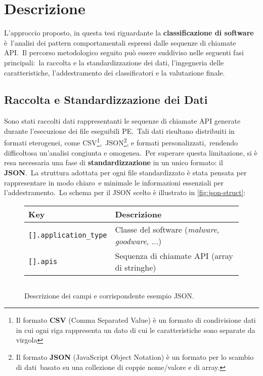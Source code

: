 \section{Descrizione}

L'approccio proposto, in questa tesi riguardante la \textbf{classificazione di software} è\
l'analisi dei pattern comportamentali espressi dalle sequenze di chiamate API.\
Il percorso metodologico seguito può essere suddiviso nelle seguenti fasi principali:\
la raccolta e la standardizzazione dei dati, l'ingegneria delle caratteristiche, l'addestramento dei classificatori
e la valutazione finale.

\subsection{Raccolta e Standardizzazione dei Dati}

Sono stati raccolti dati rappresentanti le sequenze di chiamate API generate durante l'esecuzione dei file eseguibili PE.\
Tali dati risultano distribuiti in formati eterogenei, come CSV\footnote{Il formato \textbf{CSV} (Comma Separated Value) è un formato di condivisione dati in cui ogni
    riga rappresenta un dato di cui le caratteristiche sono separate da virgola },\
JSON\footnote{Il formato \textbf{JSON} (JavaScript Object Notation) è un formato per lo scambio di dati\
    basato su una collezione di coppie nome/valore e di array.}, e formati personalizzati,\
rendendo difficoltosa un'analisi congiunta e omogenea.\
Per superare questa limitazione, si è resa necessaria una fase di \textbf{standardizzazione} in un unico formato:
il \textbf{JSON}.\
La struttura adottata per ogni file standardizzato è stata pensata per rappresentare in modo chiaro\
e minimale le informazioni essenziali per l'addestramento.\
Lo schema per il JSON scelto è illustrato in \autoref{fig:json-struct}:

\begin{figure}[h!]
    \centering
    \renewcommand{\arraystretch}{1.3}
    \begin{tabular}{p{0.25\textwidth} p{0.65\textwidth}}
        \toprule
        \textbf{Key}                  & \textbf{Descrizione}                                           \\
        \midrule
        \texttt{[].application\_type} & Classe del software (\emph{malware}, \emph{goodware}, $\dots$) \\
        \texttt{[].apis}              & Sequenza di chiamate API (array di stringhe)                   \\
        \bottomrule
    \end{tabular}

    \vspace{4mm} %

    \inputminted[fontsize=\small]{json}{approccio-proposto/example.json}
    \caption{Descrizione dei campi e corrispondente esempio JSON.}
    \label{fig:json-struct}
\end{figure}


